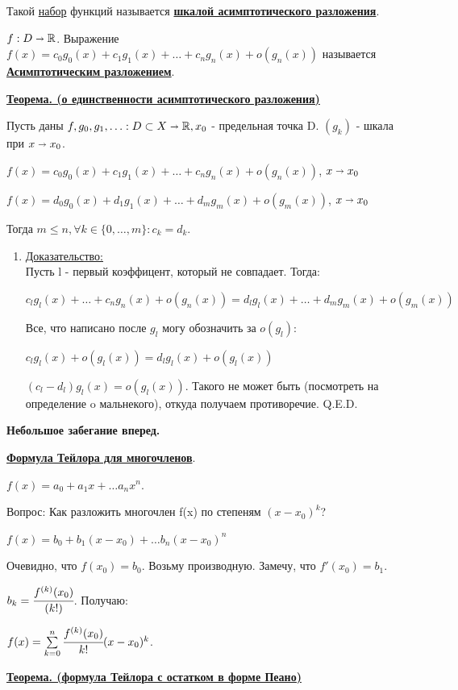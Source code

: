 \documentclass{article}
\newcommand{\deff}[1]{\underline{\textbf{#1}}}
\newcommand{\thmm}[1]{\underline{\textbf{#1}}}
\newcommand{\prooff}[1]{{\underline{Доказательство:}} \\ }
\begin{document}
Такой \uline{набор} функций называется \deff{шкалой асимптотического разложения}.

$f: D \shortrightarrow \mathbb{R}$. Выражение $f(x) = c_0 g_0(x) + c_1 g_1(x) + \ldots + c_n g_n(x) + o(g_n(x)) $ называется \deff{Асимптотическим разложением}.

\thmm{Теорема. (о единственности асимптотического разложения)}

Пусть даны $f,g_0,g_1, \ldots: D \subset X \shortrightarrow \mathbb{R}, x_0$ - предельная точка D. $(g_k)$ - шкала при $x\shortrightarrow x_0$.

$f(x) =  c_0 g_0(x) + c_1 g_1(x) + \ldots + c_n g_n(x) + o(g_n(x))$, $x\shortrightarrow x_0$

$f(x) =  d_0 g_0(x) + d_1 g_1(x) + \ldots + d_m g_m(x) + o(g_m(x))$, $x\shortrightarrow x_0$

Тогда $m\leq n, \forall k \in \{0,\ldots,m\}: c_k = d_k$.

\begin{enumerate}
    \item[] \prooff{}
    Пусть l - первый коэффицент, который не совпадает. Тогда:

     $ c_l g_l(x) + \ldots + c_n g_n(x) + o(g_n(x)) =  d_l g_l(x) + \ldots + d_m g_m(x) + o(g_m(x))$
     
     Все, что написано после $g_l$ могу обозначить за $o(g_l)$:

      $ c_l g_l(x) + o(g_l(x)) = d_l g_l(x) + o(g_l(x))$

      $(c_l-d_l) g_l(x) = o(g_l(x))$. Такого не может быть (посмотреть на определение o мальнекого), откуда получаем противоречие.  Q.E.D.
\end{enumerate}



\textbf{Небольшое забегание вперед.}

\deff{Формула Тейлора для многочленов}.

$f(x) = a_0 + a_1x + \ldots a_n x^n$.

Вопрос: Как разложить многочлен f(x) по степеням $(x-x_0)^k$?

$f(x) = b_0 + b_1 (x-x_0) +\ldots b_n (x-x_0)^n$

Очевидно, что $f(x_0) = b_0$. Возьму производную. Замечу, что $f'(x_0) = b_1$. 

$b_k = \cfrac{f^{(k)}(x_0)}{(k!)}$. Получаю:

$f(x) = \sum\limits_{k=0}^n \cfrac{f^{(k)}(x_0)}{k!} (x-x_0)^k$.

\thmm{Теорема. (формула Тейлора с остатком в форме Пеано)}
\end{document}
